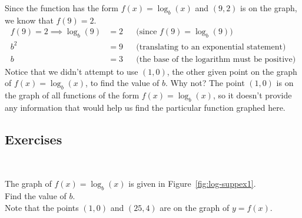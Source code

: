 \begin{mySolution}
Since the function has the form $f(x) = \log_b(x)$ and $(9,2)$ is on the graph, we know that $f(9)=2$.  
\begin{align*}
f(9)=2 \implies \log_b(9)&=2 &&\text{(since $f(9) = \log_b(9)$)}\\
  b^2&=9 &&\text{(translating to an exponential statement)}\\
  b&=3 &&\text{(the base of the logarithm must be positive)}
\end{align*}
Notice that we didn't attempt to use $(1,0)$, the other given point on the graph of $f(x)=\log_b(x)$, to find the value of $b$.  Why not?  The point $(1,0)$ is on the graph of all functions of the form $f(x) = \log_b(x)$, so it doesn't provide any information that would help us find the particular function graphed here.
\end{mySolution}


\vfill

\newpage

\subsection*{Exercises} \label{exercises-appendix-logarithmic}

\begin{myExercise}~\\[-8mm]
\begin{minipage}{0.5\linewidth}
	The graph of $f(x)= \log_b(x)$ is given in Figure~\ref{fig:log-suppex1}.  \\Find the value of $b$.\\[3mm]
	Note that the points $(1,0)$ and $(25,4)$ are on the graph of $y=f(x)$.
\end{minipage}
\begin{minipage}{0.5\linewidth}
	\begin{center}
			\label{fig:log-suppex1}
	\end{center}
\end{minipage}


\end{myExercise}




